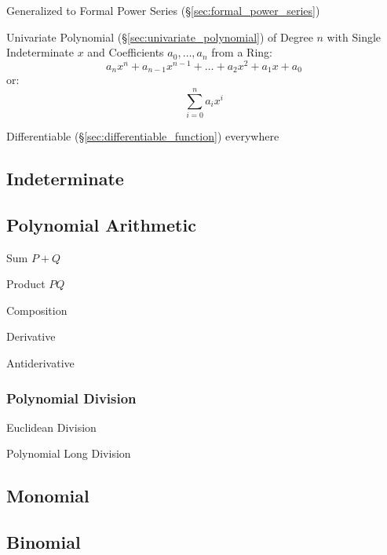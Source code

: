Generalized to Formal Power Series (\S\ref{sec:formal_power_series})

Univariate Polynomial (\S\ref{sec:univariate_polynomial}) of Degree
$n$ with Single Indeterminate $x$ and Coefficients $a_0, \ldots, a_n$
from a Ring:
\[
  a_n x^n + a_{n-1} x^{n-1} + \ldots + a_2 x^2 + a_1 x + a_0
\]
or:
\[
  \sum_{i=0}^n a_i x^i
\]

Differentiable (\S\ref{sec:differentiable_function}) everywhere



\subsection{Indeterminate}\label{sec:indeterminate}

\subsection{Polynomial Arithmetic}\label{sec:polynomial_arithmetic}

Sum $P + Q$

Product $P Q$

Composition

Derivative

Antiderivative



\subsubsection{Polynomial Division}\label{sec:polynomial_division}

Euclidean Division

Polynomial Long Division



\subsection{Monomial}\label{sec:monomial}

\subsection{Binomial}\label{sec:binomial}

